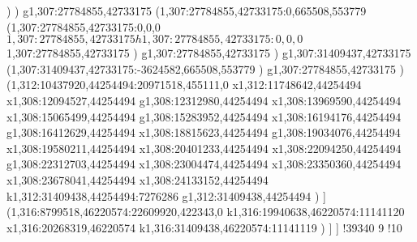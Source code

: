 {)
)
g1,307:27784855,42733175
(1,307:27784855,42733175:0,665508,553779
(1,307:27784855,42733175:0,0,0
$1,307:27784855,42733175
h1,307:27784855,42733175:0,0,0
$1,307:27784855,42733175
)
g1,307:27784855,42733175
)
g1,307:31409437,42733175
(1,307:31409437,42733175:-3624582,665508,553779
)
g1,307:27784855,42733175
)
(1,312:10437920,44254494:20971518,455111,0
x1,312:11748642,44254494
x1,308:12094527,44254494
g1,308:12312980,44254494
x1,308:13969590,44254494
x1,308:15065499,44254494
g1,308:15283952,44254494
x1,308:16194176,44254494
g1,308:16412629,44254494
x1,308:18815623,44254494
g1,308:19034076,44254494
x1,308:19580211,44254494
x1,308:20401233,44254494
x1,308:22094250,44254494
g1,308:22312703,44254494
x1,308:23004474,44254494
x1,308:23350360,44254494
x1,308:23678041,44254494
x1,308:24133152,44254494
k1,312:31409438,44254494:7276286
g1,312:31409438,44254494
)
]
(1,316:8799518,46220574:22609920,422343,0
k1,316:19940638,46220574:11141120
x1,316:20268319,46220574
k1,316:31409438,46220574:11141119
)
]
]
!39340
}9
!10
